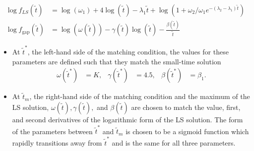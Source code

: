 \documentclass{beamer}
\begin{document}
\begin{frame}
  \begin{align*}
    \log f_{LS}(\tilde{t}) &= \log(\omega_1) + 4 \log(\tilde{t}) -\lambda_1\tilde{t} + \log\left(1 + \omega_2/\omega_1 e^{-(\lambda_2-\lambda_1)\tilde{t}} \right) \\
    \log f_{\mbox{gap}}(\tilde{t}) &= \log(\omega(\tilde{t})) -
                                         \gamma(\tilde{t})\log(\tilde{t}) -
                                         \frac{\beta(\tilde{t})}{\tilde{t}}
  \end{align*}

  \begin{itemize}
  \item At $\tilde{t}^*$, the
    left-hand side of the matching condition, the values for these
    parameters are defined such that they match the small-time solution
    \begin{align*}
      \omega(\tilde{t}^*) &= K, & \gamma(\tilde{t}^*) &= 4.5, & \beta(\tilde{t}^*) &= \beta_1.
    \end{align*}
  \item At $\tilde{t}_m$, the right-hand side of the matching condition and
    the maximum of the LS solution,
    $\omega(\tilde{t}), \gamma(\tilde{t}),$ and $\beta(\tilde{t})$ are
    chosen to match the value, first, and second derivatives of the
    logarithmic form of the LS solution. The form of the parameters
    between $\tilde{t}^*$ and $\tilde{t}_m$ is chosen to be a sigmoid
    function which rapidly transitions away from $\tilde{t}^*$ and is the
    same for all three parameters.
  \end{itemize}
  \end{frame}
\end{document}
